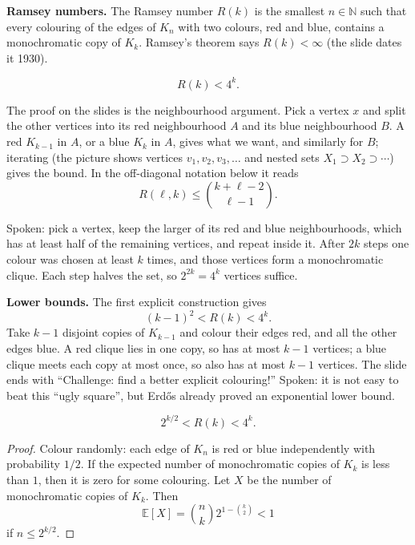 \medskip\noindent
{\bf Ramsey numbers.} The Ramsey number
$R(k)$
is the smallest $n \in \mathbb{N}$ such that
every colouring of the edges of $K_n$ with
two colours, red and blue, contains a
monochromatic copy of $K_k$.
Ramsey's theorem says $R(k) < \infty$
(the slide dates it 1930).

\begin{theorem}
\label{theorem-erdos-szekeres-upper}
$$
R(k) < 4^k.
$$
\end{theorem}

\noindent
The proof on the slides is the neighbourhood
argument. Pick a vertex $x$ and split the
other vertices into its red neighbourhood
$A$ and its blue neighbourhood $B$. A red
$K_{k-1}$ in $A$, or a blue $K_k$ in $A$,
gives what we want, and similarly for $B$;
iterating (the picture shows vertices
$v_1, v_2, v_3, \ldots$ and nested sets
$X_1 \supset X_2 \supset \cdots$) gives the
bound. In the off-diagonal notation below it
reads
$$
R(\ell,k)
\le \binom{k+\ell-2}{\ell-1}.
$$

Spoken: pick a vertex, keep the larger of
its red and blue neighbourhoods, which has at
least half of the remaining vertices, and
repeat inside it. After $2k$ steps one colour
was chosen at least $k$ times, and those
vertices form a monochromatic clique. Each
step halves the set, so $2^{2k} = 4^k$
vertices suffice.

\medskip\noindent
{\bf Lower bounds.} The first explicit
construction gives
$$
(k-1)^2 < R(k) < 4^k.
$$
Take $k-1$ disjoint copies of $K_{k-1}$ and
colour their edges red, and all the other
edges blue. A red clique lies in one copy, so
has at most $k-1$ vertices; a blue clique
meets each copy at most once, so also has at
most $k-1$ vertices. The slide ends with
``Challenge: find a better explicit
colouring!'' Spoken: it is not easy to beat
this ``ugly square'', but Erd\H{o}s already
proved an exponential lower bound.

\begin{theorem}[Erd\H{o}s, 1947]
\label{theorem-erdos-1947}
$$
2^{k/2} < R(k) < 4^k.
$$
\end{theorem}

\begin{proof}
Colour randomly: each edge of $K_n$ is red or
blue independently with probability $1/2$.
If the expected number of monochromatic
copies of $K_k$ is less than $1$, then it is
zero for some colouring. Let $X$ be the
number of monochromatic copies of $K_k$. Then
$$
\mathbb{E}[X]
= \binom{n}{k} 2^{1 - \binom{k}{2}}
< 1
$$
if $n \le 2^{k/2}$.
\end{proof}

